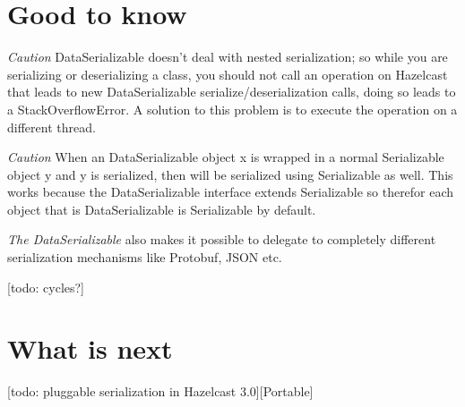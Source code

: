 \section{Good to know}

\emph{Caution} DataSerializable doesn't deal with nested serialization; so while you are serializing or deserializing a class, you should not call an operation on Hazelcast that leads to new DataSerializable serialize/deserialization calls,  doing so leads to a StackOverflowError. A solution to this problem is to execute the operation on a different thread. 

\emph{Caution} When an DataSerializable object x is wrapped in a normal Serializable object y and y is serialized, then will be serialized using Serializable as well. This works because the DataSerializable interface extends Serializable so therefor each object that is DataSerializable is Serializable by default.

\emph{The DataSerializable} also makes it possible to delegate to completely different serialization mechanisms like Protobuf, JSON etc.

[todo: cycles?]

\section{What is next}

[todo: pluggable serialization in Hazelcast 3.0][Portable]